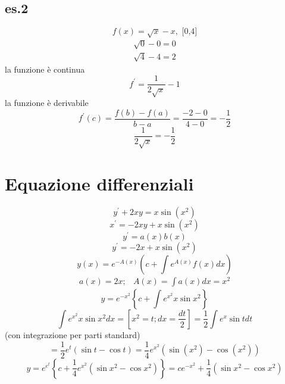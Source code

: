 \documentclass{article}
\begin{document}
\subsection{es.2}
\begin{equation*}
	f(x)=\sqrt{x}-x,\text{ [0,4]}
\end{equation*}
\begin{equation*}
	\begin{matrix}
		\sqrt{0}-0=0\\
		\sqrt{4}-4=2
	\end{matrix}
\end{equation*}
la funzione è continua
\begin{equation*}
	f^\prime=\frac{1}{2\sqrt{x}}-1
\end{equation*}
la funzione è derivabile
\begin{equation*}
	f^\prime(c)=\frac{f(b)-f(a)}{b-a}=\frac{-2-0}{4-0}=-\frac{1}{2}
\end{equation*}
\begin{equation*}
	\boxed{\frac{1}{2\sqrt{x}}=-\frac{1}{2}}
\end{equation*}

\section{Equazione differenziali}
\begin{equation*}
	y^\prime+2xy=x\sin(x^2)
\end{equation*}
\begin{equation*}
	x^\prime=-2xy+x\sin(x^2)
\end{equation*}
\begin{equation*}
	y^\prime=a(x)b(x)
\end{equation*}
\begin{equation*}
	y^\prime=-2x+x\sin(x^2)
\end{equation*}
\begin{equation*}
	y(x)=e^{-A(x)}\left(c+\int e^{A(x)}f(x)dx\right)
\end{equation*}
\begin{equation*}
	\begin{matrix}
		a(x)=2x;&A(x)=\int a(x)dx=x^2
	\end{matrix}
\end{equation*}
\begin{equation}
	y=e^{-x^2}\left\{c+\int e^{x^2}x\sin x^2\right\}
\end{equation}
\begin{equation}
	\int e^{x^2}x\sin x^2dx=\left[x^2=t;dx=\frac{dt}{2}\right]=\frac{1}{2}\int e^x\sin tdt
\end{equation}
(con integrazione per parti standard)
\begin{equation}
	=\frac{1}{2}e^t(\sin t-\cos t)=\frac{1}{4}e^{x^2}(\sin(x^2)-\cos(x^2))
\end{equation}
\begin{equation*}
	y=e^{e^t}\left\{c+\frac{1}{4}e^{x^2}(\sin x^2-\cos x^2)\right\}=ce^{-x^2}+\frac{1}{4}(\sin x^2-\cos x^2)
\end{equation*}
\end{document}

